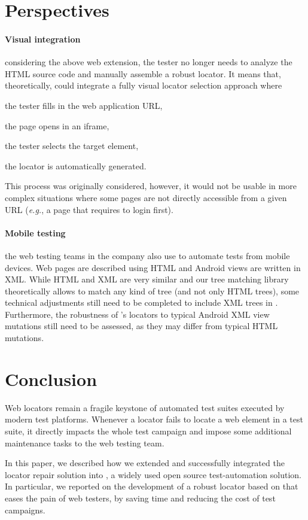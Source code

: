 \documentclass[10pt,conference]{IEEEtran}
\begin{document}
\section{Perspectives}\label{sec:perspectives}
\paragraph{Visual integration}
considering the above \erratum web extension, the tester no longer needs to analyze the HTML source code and manually assemble a robust locator.
It means that, theoretically, \cerberus could integrate a fully visual locator selection approach where
\begin{inparaenum}[\em (i)]
    \item the tester fills in the web application URL,
    \item the page opens in an iframe,
    \item the tester selects the target element,
    \item the \erratum locator is automatically generated.
\end{inparaenum}
This process was originally considered, however, it would not be usable in more complex situations where some pages are not directly accessible from a given URL (\emph{e.g.}, a page that requires to login first).

\paragraph{Mobile testing}
the web testing teams in the \laredoute{} company also use \cerberus to automate tests from mobile devices.
Web pages are described using HTML and Android views are written in XML.
While HTML and XML are very similar and our tree matching library theoretically allows \erratum to match any kind of tree (and not only HTML trees), some technical adjustments still need to be completed to include XML trees in \cerberus.
Furthermore, the robustness of \erratum's locators to typical Android XML view mutations still need to be assessed, as they may differ from typical HTML mutations.

\section{Conclusion}\label{sec:conclusion}
Web locators remain a fragile keystone of automated test suites executed by modern test platforms.
Whenever a locator fails to locate a web element in a test suite, it directly impacts the whole test campaign and impose some additional maintenance tasks to the web testing team.

In this paper, we described how we extended and successfully integrated the locator repair solution \erratum into \cerberus, a widely used open source test-automation solution.
In particular, we reported on the development of a robust locator based on \erratum that eases the pain of web testers, by saving time and reducing the cost of test campaigns.



\end{document}
